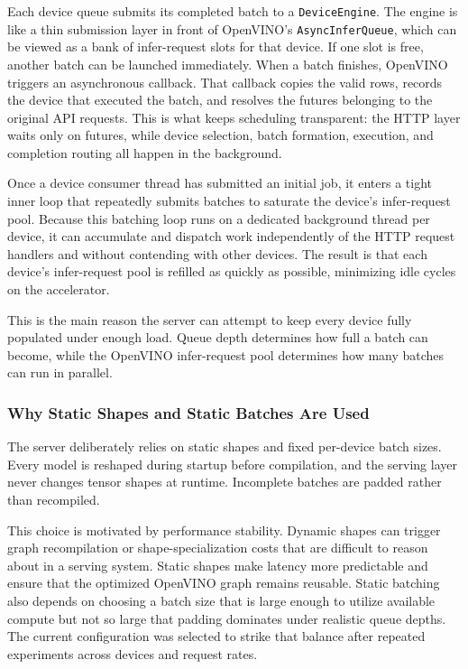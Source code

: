\documentclass[conference]{IEEEtran}
\begin{document}
Each device queue submits its completed batch to a \texttt{DeviceEngine}. The engine is like a thin submission layer in front of OpenVINO's \texttt{AsyncInferQueue}, which can be viewed as a bank of infer-request slots for that device. If one slot is free, another batch can be launched immediately. When a batch finishes, OpenVINO triggers an asynchronous callback. That callback copies the valid rows, records the device that executed the batch, and resolves the futures belonging to the original API requests. This is what keeps scheduling transparent: the HTTP layer waits only on futures, while device selection, batch formation, execution, and completion routing all happen in the background.

Once a device consumer thread has submitted an initial job, it enters a tight inner loop that repeatedly submits batches to saturate the device's infer-request pool. Because this batching loop runs on a dedicated background thread per device, it can accumulate and dispatch work independently of the HTTP request handlers and without contending with other devices. The result is that each device's infer-request pool is refilled as quickly as possible, minimizing idle cycles on the accelerator.

This is the main reason the server can attempt to keep every device fully populated under enough load. Queue depth determines how full a batch can become, while the OpenVINO infer-request pool determines how many batches can run in parallel.


\subsubsection{Why Static Shapes and Static Batches Are Used}
The server deliberately relies on static shapes and fixed per-device batch sizes. Every model is reshaped during startup before compilation, and the serving layer never changes tensor shapes at runtime. Incomplete batches are padded rather than recompiled.

This choice is motivated by performance stability. Dynamic shapes can trigger graph recompilation or shape-specialization costs that are difficult to reason about in a serving system. Static shapes make latency more predictable and ensure that the optimized OpenVINO graph remains reusable. Static batching also depends on choosing a batch size that is large enough to utilize available compute but not so large that padding dominates under realistic queue depths. The current configuration was selected to strike that balance after repeated experiments across devices and request rates.
\end{document}
